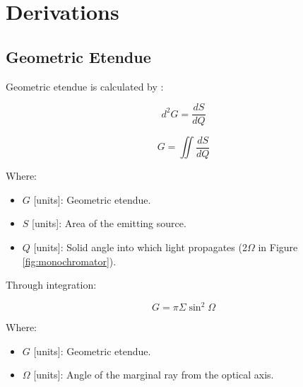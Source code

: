 \appendix
\appendixpage

\section{Derivations}



\subsection{Geometric Etendue}
Geometric etendue is calculated by \cite{Horiba_throughput_etendue}:

\begin{equation}
    d^2G = \frac{dS}{dQ}
\end{equation}

\begin{equation}
    G = \iint\frac{dS}{dQ}
\end{equation}

Where:
\begin{itemize}[label={}]
    \item $G$ [units]: Geometric etendue.
    \item $S$ [units]: Area of the emitting source.
    \item $Q$ [units]: Solid angle into which light propagates (2$\Omega$ in Figure \ref{fig:monochromator}).
\end{itemize}

Through integration:

\begin{equation}
    G = \pi\Sigma\sin^2\Omega
\end{equation}

Where:
\begin{itemize}[label={}]
    \item $G$ [units]: Geometric etendue.
    \item $\Omega$ [units]: Angle of the marginal ray from the optical axis.
\end{itemize}

